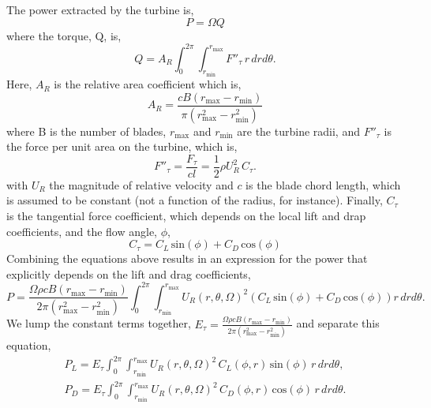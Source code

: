 The power extracted by the turbine is, 
\begin{equation}
 P = \Omega Q
\end{equation}
where the torque, Q, is, 
\begin{equation}
 Q = A_R \int_0^{2\pi} \int_{r_{\text{min}}}^{r_{\text{max}}} F''_{\tau}\, r\, dr d\theta.
\end{equation}
Here, $A_R$ is the relative area coefficient which is, 
\begin{equation}
A_R = \frac{c B (r_{\text{max}}-r_{\text{min}})}{\pi(r_{\text{max}}^2-r_{\text{min}}^2)}
\end{equation}
where B is the number of blades, $r_{\text{max}}$ and $r_{\text{min}}$
are the turbine radii, and $F''_{\tau}$ is the force per unit
area on the turbine, which is, 
\begin{equation}
 F''_{\tau} = \frac{F_{\tau}}{cl}= \frac{1}{2}\rho U_R^2 \, C_{\tau}.
\end{equation}
with $U_R$ the magnitude of relative velocity and $c$ is the blade chord
length, which is assumed to be constant (not a function of the radius,
for instance). Finally, $C_{\tau}$ is the tangential force coefficient,
which depends on the local lift and drap coefficients, and the
flow angle, $\phi$, 
\begin{equation}
 C_{\tau} = C_L \,\text{sin}(\phi) + C_D \,\text{cos}(\phi)
\end{equation}
Combining the equations above results in an expression for the power
that explicitly depends on the lift and drag coefficients, 
\begin{equation*}
 P = \frac{\Omega \rho c B (r_{\text{max}}-r_{\text{min}})}{2 \pi(r_{\text{max}}^2-r_{\text{min}}^2)}
\int_0^{2\pi}
\int_{r_{\text{min}}}^{r_{\text{max}}} U_R(r,\theta,\Omega)^2 \left(C_L
						     \,\text{sin}(\phi)
						     + C_D
						     \,\text{cos}(\phi)
						    \right) r\,dr d\theta. 
\end{equation*}
We lump the constant terms together, $E_{\tau} = \frac{\Omega \rho c B (r_{\text{max}}-r_{\text{min}})}{2 \pi(r_{\text{max}}^2-r_{\text{min}}^2)}$ and separate this equation, 
\begin{align}
 P_L = E_\tau
 \int_0^{2\pi}
  \int_{r_{\text{min}}}^{r_{\text{max}}} U_R(r,\theta,\Omega)^2 \, C_L(\phi,r)
 \,\text{sin}(\phi)\, r\,dr d\theta,  \label{lift} \\
 P_D = E_\tau
 \int_0^{2\pi}
  \int_{r_{\text{min}}}^{r_{\text{max}}} U_R(r,\theta,\Omega)^2 \, C_D(\phi,r) \,\text{cos}(\phi)\, r\,dr d\theta. \label{drag}
\end{align}
